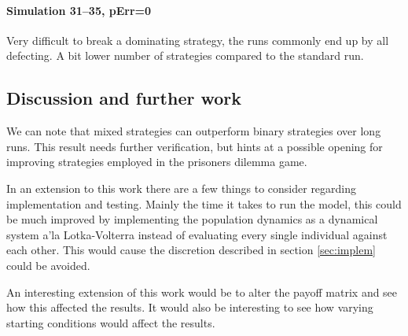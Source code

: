  

\paragraph{Simulation 31--35, pErr=0}
Very difficult to break a dominating strategy, the runs commonly end up by all defecting. A bit lower number of strategies compared to the standard run. 


\subsection{Discussion and further work}
We can note that mixed strategies can outperform binary strategies over long runs. This result needs further verification, but hints at a possible opening for improving strategies employed in the prisoners dilemma game.

In an extension to this work there are a few things to consider regarding implementation and testing. Mainly the time it takes to run the model, this could be much improved by implementing the population dynamics as a dynamical system a'la Lotka-Volterra instead of evaluating every single individual against each other. This would cause the discretion described in section \ref{sec:implem} could be avoided.

An interesting extension of this work would be to alter the payoff matrix and see how this affected the results. It would also be interesting to see how varying starting conditions would affect the results.






